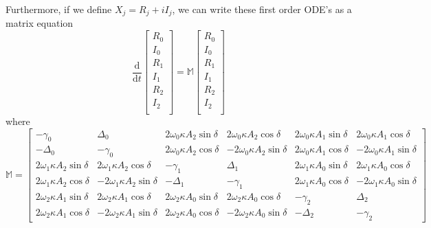 Furthermore, if we define $X_j = R_j + iI_j$, we can write these first order ODE's as a matrix equation
\begin{equation}
\frac{\mathrm{d}}{\mathrm{d}t}
\begin{bmatrix}
R_0 \\
I_0 \\
R_1 \\
I_1 \\
R_2 \\
I_2 \\
\end{bmatrix}
=
\mathbb{M}
\begin{bmatrix}
R_0 \\
I_0 \\
R_1 \\
I_1 \\
R_2 \\
I_2 \\
\end{bmatrix}
\end{equation}
where
\begin{equation}
\mathbb{M} = 
\begin{bmatrix}
            -\gamma_0         &               \Delta_0         & 2\omega_0\kappa A_2\sin\delta &  2\omega_0\kappa A_2\cos\delta & 2\omega_0\kappa A_1\sin\delta &  2\omega_0\kappa A_1\cos\delta \\
            -\Delta_0         &              -\gamma_0         & 2\omega_0\kappa A_2\cos\delta & -2\omega_0\kappa A_2\sin\delta & 2\omega_0\kappa A_1\cos\delta & -2\omega_0\kappa A_1\sin\delta \\
2\omega_1\kappa A_2\sin\delta &  2\omega_1\kappa A_2\cos\delta &             -\gamma_1         &              \Delta_1          & 2\omega_1\kappa A_0\sin\delta &  2\omega_1\kappa A_0\cos\delta \\
2\omega_1\kappa A_2\cos\delta & -2\omega_1\kappa A_2\sin\delta &             -\Delta_1         &             -\gamma_1          & 2\omega_1\kappa A_0\cos\delta & -2\omega_1\kappa A_0\sin\delta \\ 
2\omega_2\kappa A_1\sin\delta &  2\omega_2\kappa A_1\cos\delta & 2\omega_2\kappa A_0\sin\delta &  2\omega_2\kappa A_0\cos\delta &            -\gamma_2          &          \Delta_2              \\
2\omega_2\kappa A_1\cos\delta & -2\omega_2\kappa A_1\sin\delta & 2\omega_2\kappa A_0\cos\delta & -2\omega_2\kappa A_0\sin\delta &            -\Delta_2          &         -\gamma_2        
\end{bmatrix}
\end{equation}

